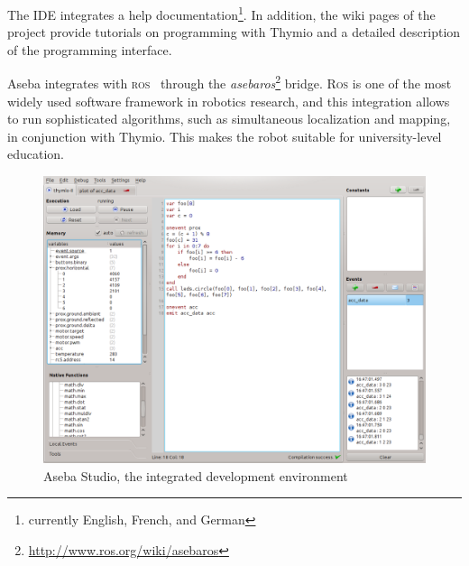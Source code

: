 \documentclass[letterpaper, 10 pt, conference]{ieeeconf}  %
\begin{document}

The IDE integrates a help documentation\footnote{currently English, French, and German}.
In addition, the wiki pages of the project provide tutorials on programming with Thymio and a detailed description of the programming interface.

Aseba integrates with \textsc{ros}~\cite{quigley2009ros} through the \emph{asebaros}\footnote{\url{http://www.ros.org/wiki/asebaros}} bridge.
\textsc{Ros} is one of the most widely used software framework in robotics research, and this integration allows to run sophisticated algorithms, such as simultaneous localization and mapping, in conjunction with  Thymio.
This makes the robot suitable for university-level education.

\begin{figure}
\centering
\includegraphics[width=.9\columnwidth]{figures/aseba-studio}
\caption{Aseba Studio, the integrated development environment}
\label{fig:aseba-studio}
\end{figure}
\end{document}
